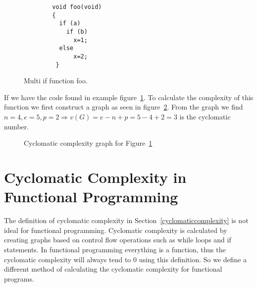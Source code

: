 \documentclass[12pt]{report}
\theoremstyle{definition}
\theoremstyle{theorem}
\begin{document}
\begin{figure}[H]
    \begin{lstlisting}
        void foo(void)
        {
          if (a)
            if (b) 
              x=1;
          else
              x=2;
         }
    \end{lstlisting}
    \caption{Multi if function foo.}\label{c1excode}
\end{figure}

If we have the code found in example figure~\ref{c1excode}. To calculate the
complexity of this function we first construct a graph as seen in
figure~\ref{fig:c1exgraph}. From the graph we find $n=4, e=5, p=2\Rightarrow
v(G)=e-n+p=5-4+2=3$ is the cyclomatic number.

\begin{figure}[H]
    \centering
    \caption{Cyclomatic complexity graph for Figure~\ref{c1excode}}\label{fig:c1exgraph}
\end{figure}

\section{Cyclomatic Complexity in Functional
Programming}

The definition of cyclomatic complexity in Section~\ref{cyclomaticcomplexity} is
not ideal for functional programming. Cyclomatic complexity is calculated by
creating graphs based on control flow operations such as while loops and if
statements. In functional programming everything is a function, thus the
cyclomatic complexity will always tend to 0 using this definition. So we define
a different method of calculating the cyclomatic complexity for functional
programs. 
\end{document}
